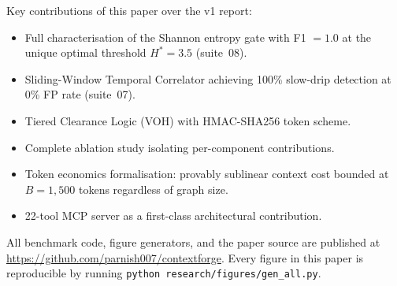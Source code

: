 \documentclass[11pt]{article}
\begin{document}
Key contributions of this paper over the v1 report:
\begin{itemize}
  \item Full characterisation of the Shannon entropy gate with F1 $= 1.0$
    at the unique optimal threshold $H^{*} = 3.5$ (suite~08).
  \item Sliding-Window Temporal Correlator achieving 100\% slow-drip detection
    at 0\% FP rate (suite~07).
  \item Tiered Clearance Logic (VOH) with HMAC-SHA256 token scheme.
  \item Complete ablation study isolating per-component contributions.
  \item Token economics formalisation: provably sublinear context cost
    bounded at $B = 1{,}500$ tokens regardless of graph size.
  \item 22-tool MCP server as a first-class architectural contribution.
\end{itemize}

All benchmark code, figure generators, and the paper source are published
at \url{https://github.com/parnish007/contextforge}. Every figure in this
paper is reproducible by running \texttt{python research/figures/gen\_all.py}.

\printbibliography
\end{document}
